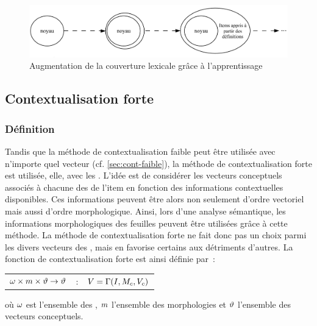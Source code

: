 \begin{figure}[h]
  \centering\includegraphics[width=16cm]{2_Etat-art/img/augmentation-noyau}
\caption{Augmentation de la couverture lexicale grâce à l'apprentissage}\label{fig:noyau}
\end{figure}

\subsection{Contextualisation forte}
\label{sec:context-forte}

\subsubsection{Définition}

Tandis que la méthode de contextualisation faible peut être utilisée
avec n'importe quel vecteur (cf. \ref{sec:cont-faible}), la méthode de
contextualisation forte est utilisée, elle, avec les . L'idée est de considérer les vecteurs
conceptuels associés à chacune des
 de l'item en fonction des informations contextuelles
disponibles.  Ces informations peuvent être alors non seulement
d'ordre vectoriel mais aussi d'ordre morphologique. Ainsi, lors d'une
analyse sémantique, les informations morphologiques des feuilles
peuvent être utilisées grâce à cette méthode. La méthode de
contextualisation forte ne fait donc pas un choix parmi les divers
vecteurs des , mais en favorise certains aux détriments
d'autres. La fonction de contextualisation forte est ainsi définie
par~:

\begin{center}

  \begin{tabular}{ccc}
    $\omega\times m \times\vartheta \rightarrow \vartheta$&:&$V =
    \Gamma(I, M_{c}, V_{c})$\\    
  \end{tabular}
\end{center}

où $\omega$ est l'ensemble des , $m$
l'ensemble des morphologies et $\vartheta$ l'ensemble des vecteurs
conceptuels.

